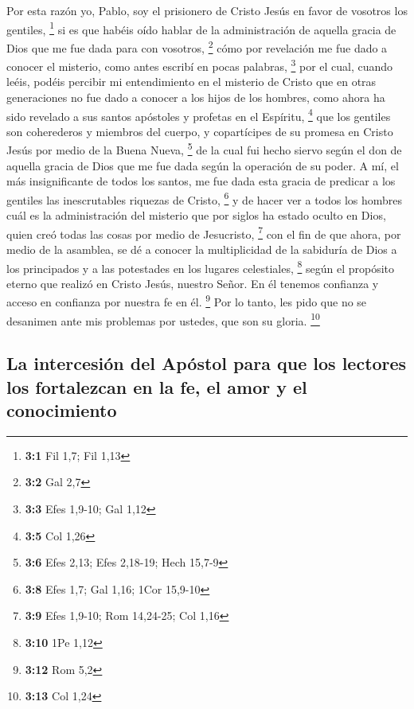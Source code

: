 \begin{paracol}{2}
 Por esta razón yo, Pablo, soy el prisionero de Cristo
Jesús en favor de vosotros los gentiles, \footnote{\textbf{3:1} Fil 1,7;
  Fil 1,13}  si es que habéis oído hablar de la
administración de aquella gracia de Dios que me fue dada para con
vosotros, \footnote{\textbf{3:2} Gal 2,7}  cómo por
revelación me fue dado a conocer el misterio, como antes escribí en
pocas palabras, \footnote{\textbf{3:3} Efes 1,9-10; Gal 1,12}
 por el cual, cuando leéis, podéis percibir mi
entendimiento en el misterio de Cristo  que en otras
generaciones no fue dado a conocer a los hijos de los hombres, como
ahora ha sido revelado a sus santos apóstoles y profetas en el Espíritu,
\footnote{\textbf{3:5} Col 1,26}  que los gentiles son
coherederos y miembros del cuerpo, y copartícipes de su promesa en
Cristo Jesús por medio de la Buena Nueva, \footnote{\textbf{3:6} Efes
  2,13; Efes 2,18-19; Hech 15,7-9}  de la cual fui hecho
siervo según el don de aquella gracia de Dios que me fue dada según la
operación de su poder.  A mí, el más insignificante de
todos los santos, me fue dada esta gracia de predicar a los gentiles las
inescrutables riquezas de Cristo, \footnote{\textbf{3:8} Efes 1,7; Gal
  1,16; 1Cor 15,9-10}  y de hacer ver a todos los hombres
cuál es la administración del misterio que por siglos ha estado oculto
en Dios, quien creó todas las cosas por medio de Jesucristo, \footnote{\textbf{3:9}
  Efes 1,9-10; Rom 14,24-25; Col 1,16}  con el fin de que
ahora, por medio de la asamblea, se dé a conocer la multiplicidad de la
sabiduría de Dios a los principados y a las potestades en los lugares
celestiales, \footnote{\textbf{3:10} 1Pe 1,12}  según el
propósito eterno que realizó en Cristo Jesús, nuestro Señor.
 En él tenemos confianza y acceso en confianza por
nuestra fe en él. \footnote{\textbf{3:12} Rom 5,2}  Por
lo tanto, les pido que no se desanimen ante mis problemas por ustedes,
que son su gloria. \footnote{\textbf{3:13} Col 1,24}

\hypertarget{la-intercesiuxf3n-del-apuxf3stol-para-que-los-lectores-los-fortalezcan-en-la-fe-el-amor-y-el-conocimiento}{%
\subsection{La intercesión del Apóstol para que los lectores los
fortalezcan en la fe, el amor y el
conocimiento}\label{la-intercesiuxf3n-del-apuxf3stol-para-que-los-lectores-los-fortalezcan-en-la-fe-el-amor-y-el-conocimiento}}


\end{paracol}
